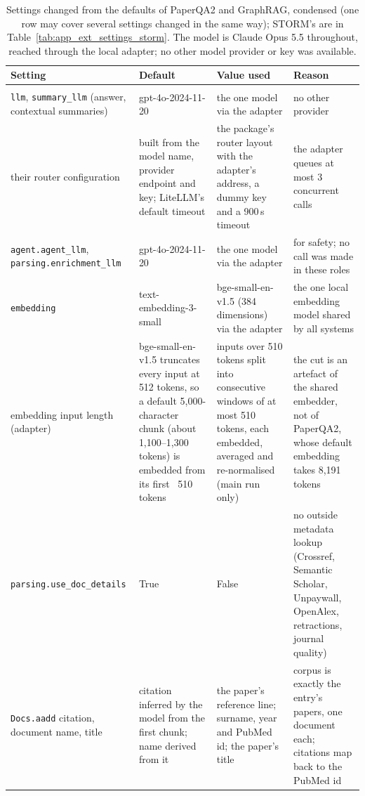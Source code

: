\documentclass{article} %
\begin{document}
\begin{table}[!htbp]
\caption{Settings changed from the defaults of PaperQA2 and GraphRAG, condensed (one row may cover several settings changed in the same way); STORM's are in Table~\ref{tab:app_ext_settings_storm}. The model is Claude Opus 5.5 throughout, reached through the local adapter; no other model provider or key was available.}
\label{tab:app_ext_settings}
\scriptsize
\setlength{\tabcolsep}{3pt}
\begin{tabularx}{\linewidth}{>{\raggedright\arraybackslash}p{2.9cm}>{\raggedright\arraybackslash}p{2.9cm}>{\raggedright\arraybackslash}p{3.2cm}>{\raggedright\arraybackslash}X}
\toprule
Setting & Default & Value used & Reason \\
\midrule
\multicolumn{4}{l}{\emph{PaperQA2 (paper-qa 2026.8.12)}} \\
\texttt{llm}, \texttt{summary\_llm} (answer, contextual summaries) & gpt-4o-2024-11-20 & the one model via the adapter & no other provider \\
their router configuration & built from the model name, provider endpoint and key; LiteLLM's default timeout & the package's router layout with the adapter's address, a dummy key and a 900\,s timeout & the adapter queues at most 3 concurrent calls \\
\texttt{agent.}\allowbreak\texttt{agent\_llm}, \texttt{parsing.}\allowbreak\texttt{enrichment\_llm} & gpt-4o-2024-11-20 & the one model via the adapter & for safety; no call was made in these roles \\
\texttt{embedding} & text-embedding-3-small & bge-small-en-v1.5 (384 dimensions) via the adapter & the one local embedding model shared by all systems \\
embedding input length (adapter) & bge-small-en-v1.5 truncates every input at 512 tokens, so a default 5,000-character chunk (about 1,100--1,300 tokens) is embedded from its first ~510 tokens & inputs over 510 tokens split into consecutive windows of at most 510 tokens, each embedded, averaged and re-normalised (main run only) & the cut is an artefact of the shared embedder, not of PaperQA2, whose default embedding takes 8,191 tokens \\
\texttt{parsing.}\allowbreak\texttt{use\_doc\_details} & True & False & no outside metadata lookup (Crossref, Semantic Scholar, Unpaywall, OpenAlex, retractions, journal quality) \\
\texttt{Docs.aadd} citation, document name, title & citation inferred by the model from the first chunk; name derived from it & the paper's reference line; surname, year and PubMed id; the paper's title & corpus is exactly the entry's papers, one document each; citations map back to the PubMed id \\

\end{tabularx}
\end{table}
\end{document}
